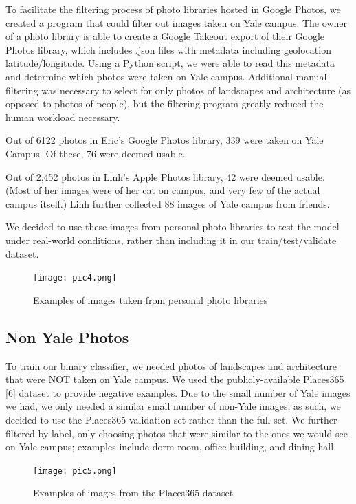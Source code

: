 \documentclass[letterpaper]{article} %
\begin{document}
To facilitate the filtering process of photo libraries hosted in Google Photos, we created a program that could filter out images taken on Yale campus. The owner of a photo library is able to create a Google Takeout export of their Google Photos library, which includes .json files with metadata including geolocation latitude/longitude. Using a Python script, we were able to read this metadata and determine which photos were taken on Yale campus. Additional manual filtering was necessary to select for only photos of landscapes and architecture (as opposed to photos of people), but the filtering program greatly reduced the human workload necessary.

Out of 6122 photos in Eric’s Google Photos library, 339 were taken on Yale Campus. Of these, 76 were deemed usable.

Out of 2,452 photos in Linh’s Apple Photos library, 42 were deemed usable. (Most of her images were of her cat on campus, and very few of the actual campus itself.) Linh further collected 88 images of Yale campus from friends.

We decided to use these images from personal photo libraries to test the model under real-world conditions, rather than including it in our train/test/validate dataset. 

\begin{figure}
    \centering
    \texttt{[image: pic4.png]}
    \caption{Examples of images taken from personal photo libraries}
    \label{fig:enter-label}
\end{figure}



\subsection{Non Yale Photos}
To train our binary classifier, we needed photos of landscapes and architecture that were NOT taken on Yale campus. We used the publicly-available Places365 [6] dataset to provide negative examples. Due to the small number of Yale images we had, we only needed a similar small number of non-Yale images; as such, we decided to use the Places365 validation set rather than the full set. We further filtered by label, only choosing photos that were similar to the ones we would see on Yale campus; examples include dorm room, office building, and dining hall. 

\begin{figure}
    \centering
    \texttt{[image: pic5.png]}
    \caption{Examples of images from the Places365 dataset}
    \label{fig:enter-label}
\end{figure}
\end{document}
